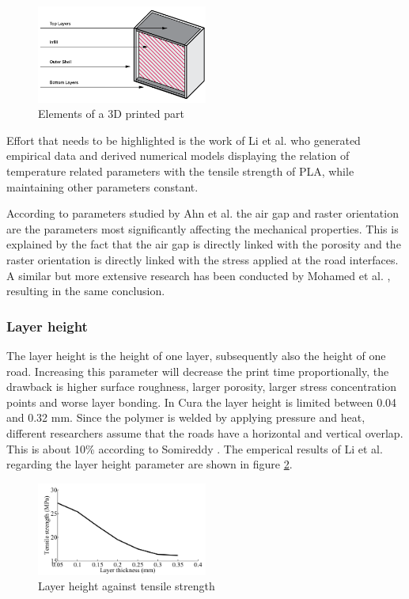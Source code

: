 \begin{figure}[H]
    \centering
    \includegraphics[width=0.5\textwidth]{chapter_2/figures/Shell.PNG}
    \caption{Elements of a 3D printed part \cite{3DHubsIntroductionPrinting}}
    \label{fig:Shell}
\end{figure}
Effort that needs to be highlighted is the work of  Li et al. \cite{Li2017TheProperties} who generated empirical data and derived numerical models displaying the relation of temperature related parameters with the tensile strength of PLA, while maintaining other parameters constant.

According to parameters studied by Ahn et al. \cite{Ahn2002AnisotropicABS} the air gap and raster orientation are the parameters most significantly affecting the mechanical properties. This is explained by the fact that the air gap is directly linked with the porosity and the raster orientation is directly linked with the stress applied at the road interfaces.
A similar but more extensive research has been conducted by Mohamed et al. \cite{Mohamed2016EffectExperiment}, resulting in the same conclusion.

\subsubsection{Layer height}
The layer height is the height of one layer, subsequently also the height of one road. Increasing this parameter will decrease the print time proportionally, the drawback is higher surface roughness, larger porosity, larger stress concentration points and worse layer bonding. In Cura the layer height is limited between 0.04 and 0.32 mm. Since the polymer is welded by applying pressure and heat, different researchers assume that the roads have a horizontal and vertical overlap. This is about 10\% according to Somireddy \cite{Somireddy2017MechanicalMesostructure}.  The emperical results of Li et al. \cite{Li2017TheProperties} regarding the layer height parameter are shown in figure \ref{fig:Layerheigth}.

\begin{figure}[H]
    \centering
    \includegraphics[width=0.5\textwidth]{chapter_2/figures/Layerheight.PNG}
    \caption{Layer height against tensile strength \cite{Li2017TheProperties}}
    \label{fig:Layerheigth}
\end{figure}

